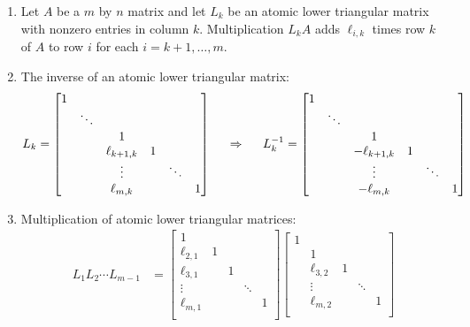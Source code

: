 \begin{proposition}
\begin{enumerate}
\item Let $A$ be a $m$ by $n$ matrix and let $L_k$ be an atomic lower triangular matrix with nonzero entries in column $k$. Multiplication $L_k A$ adds $\ell_{i,k}$ times row $k$ of $A$ to row $i$ for each $i = k+1,\dots,m$.
\item The inverse of an atomic lower triangular matrix:
$$
L_k =
\begin{bmatrix}
1 & & & & & \\
 & \ddots & & & & \\
 & & 1 & & & \\
 & & \ell_{k+1,k}& 1 & & \\
 & & \vdots & & \ddots & \\
 & & \ell_{m,k} & & & 1 \\
\end{bmatrix}
\hspace{5mm} \Rightarrow \hspace{5mm} 
L_k^{-1} =
\begin{bmatrix}
1 & & & & & \\
 & \ddots & & & & \\
 & & 1 & & & \\
 & & -\ell_{k+1,k}& 1 & & \\
 & & \vdots & & \ddots & \\
 & & -\ell_{m,k} & & & 1 \\
\end{bmatrix}
$$
\item Multiplication of atomic lower triangular matrices:
\begin{align*}
L_1 L_2 \cdots L_{m-1} &=
\begin{bmatrix}
1 & & & & \\
\ell_{2,1} & 1 & & & \\
\ell_{3,1} & & 1 & & \\
\vdots & & & \ddots & \\
\ell_{m,1} & & & & 1 \\
\end{bmatrix}
\begin{bmatrix}
1 & & & & \\
& 1 & & & \\
& \ell_{3,2} & 1 & & \\
& \vdots & & \ddots & \\
& \ell_{m,2} & & & 1 \\
\end{bmatrix}

\end{align*}
\end{enumerate}
\end{proposition}
